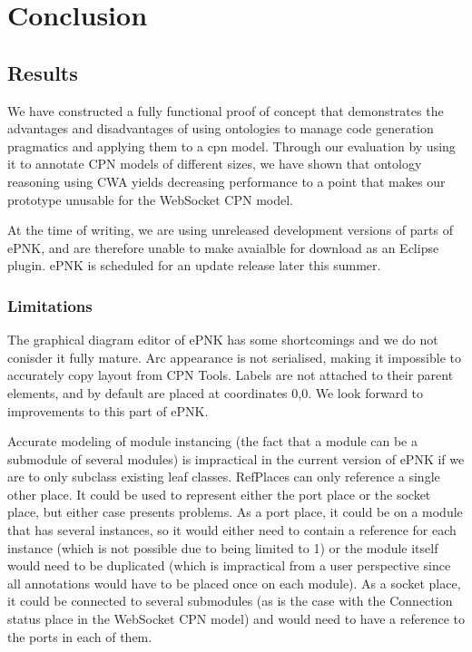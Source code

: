 \chapter{Conclusion}
\label{chap:conclusion}


\section{Results}

We have constructed a fully functional proof of concept that demonstrates the
advantages and disadvantages of using ontologies to manage code generation
pragmatics and applying them to a cpn model. Through our evaluation by using it to annotate CPN models
of different sizes, we have shown that ontology reasoning using CWA yields
decreasing performance to a point that makes our prototype unusable for the
WebSocket CPN model.

At the time of writing, we are using unreleased development versions of parts of
ePNK, and are therefore unable to make \thename{} avaialble for download as an
Eclipse plugin.
ePNK is scheduled for an update release later this summer.

\subsection{Limitations}

The graphical diagram editor of ePNK has some shortcomings and we do not
conisder it fully mature. Arc appearance is not serialised, making it impossible
to accurately copy layout from CPN Tools. Labels are not attached to their
parent elements, and by default are placed at coordinates 0,0. We look forward
to improvements to this part of ePNK.

Accurate modeling of module instancing (the fact that a module can be a
submodule of several modules) is impractical in the current version of ePNK if
we are to only subclass existing leaf classes.
RefPlaces can only reference a single other place. It could be used to represent
either the port place or the socket place, but either case presents problems. As
a port place, it could be on a module that has several instances, so it would
either need to contain a reference for each instance (which is not possible due
to being limited to 1) or the module itself would need to be duplicated (which
is impractical from a user perspective since all annotations would have to be
placed once on each module). As a socket place, it could be connected to several
submodules (as is the case with the Connection status place in the WebSocket
CPN model) and would need to have a reference to the ports in each of them. 

